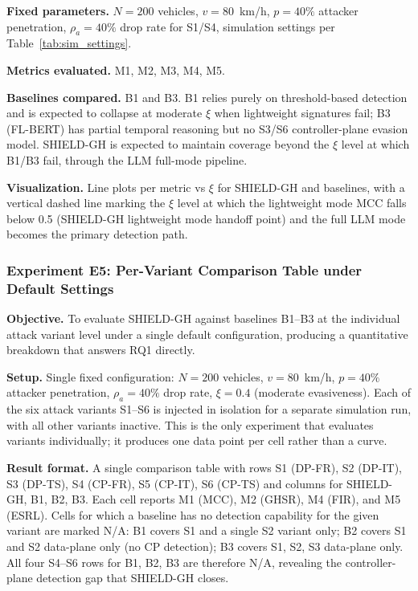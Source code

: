 \documentclass[12pt, a4paper]{report}
\newcommand{\mypar}{\vspace{0.8em}\noindent}
\begin{document}
\mypar
\textbf{Fixed parameters.}
$N = 200$ vehicles, $v = 80$~km/h, $p = 40\%$ attacker
penetration, $\rho_a = 40\%$ drop rate for S1/S4, simulation
settings per Table~\ref{tab:sim_settings}.

\mypar
\textbf{Metrics evaluated.} M1, M2, M3, M4, M5.

\mypar
\textbf{Baselines compared.}
B1 and B3. B1 relies purely on threshold-based detection and is
expected to collapse at moderate $\xi$ when lightweight signatures
fail; B3 (FL-BERT) has partial temporal reasoning but no S3/S6
controller-plane evasion model. SHIELD-GH is expected to maintain
coverage beyond the $\xi$ level at which B1/B3 fail, through the
LLM full-mode pipeline.

\mypar
\textbf{Visualization.}
Line plots per metric vs $\xi$ for SHIELD-GH and baselines, with a
vertical dashed line marking the $\xi$ level at which the lightweight
mode MCC falls below 0.5 (SHIELD-GH lightweight mode handoff point)
and the full LLM mode becomes the primary detection path.

\mypar
\subsubsection{Experiment E5: Per-Variant Comparison Table under Default Settings}
\label{sec:exp5}

\mypar
\textbf{Objective.}
To evaluate SHIELD-GH against baselines B1--B3 at the individual
attack variant level under a single default configuration, producing
a quantitative breakdown that answers RQ1 directly.

\mypar
\textbf{Setup.}
Single fixed configuration: $N = 200$ vehicles, $v = 80$~km/h,
$p = 40\%$ attacker penetration, $\rho_a = 40\%$ drop rate,
$\xi = 0.4$ (moderate evasiveness). Each of the six attack variants
S1--S6 is injected in isolation for a separate simulation run, with
all other variants inactive. This is the only experiment that
evaluates variants individually; it produces one data point per
cell rather than a curve.

\mypar
\textbf{Result format.}
A single comparison table with rows S1 (DP-FR), S2 (DP-IT),
S3 (DP-TS), S4 (CP-FR), S5 (CP-IT), S6 (CP-TS) and columns for
SHIELD-GH, B1, B2, B3. Each cell reports M1 (MCC), M2 (GHSR),
M4 (FIR), and M5 (ESRL). Cells for which a baseline has no
detection capability for the given variant are marked N/A:
B1 covers S1 and a single S2 variant only; B2 covers S1 and S2
data-plane only (no CP detection); B3 covers S1, S2, S3 data-plane
only. All four S4--S6 rows for B1, B2, B3 are therefore N/A,
revealing the controller-plane detection gap that SHIELD-GH closes.
\end{document}

